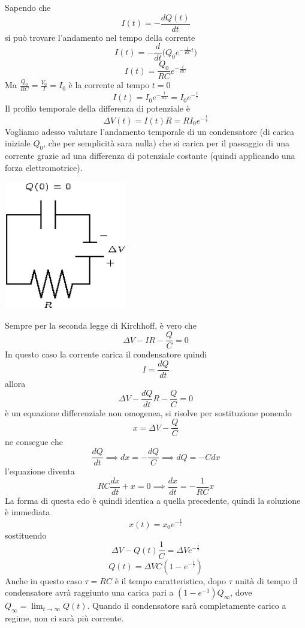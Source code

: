 \documentclass[10pt, letterpaper]{report}
\begin{document}
Sapendo che $$ I(t)=-\frac{dQ(t)}{dt}$$
si può trovare l'andamento nel tempo della corrente 
$$ I(t)=-\frac{d}{dt}\Big( Q_0e^{-\frac{1}{RC}t} \Big)$$
$$ 
I(t)=\frac{Q_0}{RC}e^{-\frac{t}{RC}}
$$
Ma $\frac{Q_0}{RC}=\frac{V_0}{I}=I_0$
è la corrente al tempo $t=0$
$$ 
I(t)=I_0e^{-\frac{t}{RC}}=I_0e^{-\frac{t}{\tau}}
$$
Il profilo temporale della differenza di potenziale è 
$$ \Delta V(t)=I(t)R=RI_0e^{-\frac{t}{\tau}}$$
Vogliamo adesso valutare l'andamento temporale di un condensatore (di carica iniziale $Q_0$, che per semplicità sara nulla) che si carica per il passaggio di una corrente grazie ad una differenza di potenziale costante (quindi applicando una forza elettromotrice).\begin{center}
    \includegraphics[width=0.4\textwidth]{images/caricaCondensatoreTempo2.eps}
\end{center}
Sempre per la seconda legge di Kirchhoff, è vero che 
$$ \Delta V-IR-\frac{Q}{C}=0$$
In questo caso la corrente carica il condensatore quindi 
$$ I=\frac{dQ}{dt}$$
allora 
$$ \Delta V - \frac{dQ}{dt}R-\frac{Q}{C}=0$$
è un equazione differenziale non omogenea, si risolve per sostituzione ponendo 
$$ x=\Delta V-\frac{Q}{C}$$
ne consegue che 
$$ \frac{dQ}{dt}\implies dx=-\frac{dQ}{C}\implies dQ=-Cdx$$
l'equazione diventa 
$$ RC\frac{dx}{dt}+x=0\implies \frac{dx}{dt}=-\frac{1}{RC}x$$
La forma di questa edo è quindi identica a quella precedente, quindi la soluzione è immediata 
$$x(t)=x_0e^{-\frac{t}{\tau}} $$
sostituendo 
$$ \Delta V-Q(t)\frac{1}{C}=\Delta Ve^{-\frac{t}{\tau}}$$
$$ Q(t)=\Delta V C(1-e^{-\frac{t}{\tau}})$$
Anche in questo caso $\tau=RC$ è il tempo caratteristico, dopo $\tau$ unità di tempo il condensatore avrà raggiunto una carica pari a $(1-e^{-1})Q_{\infty}$, dove $Q_{\infty}=\lim_{t\rightarrow\infty}Q(t)$. Quando il condensatore sarà completamente carico a regime, non ci sarà più corrente.\begin{center}
\end{center}
\end{document}
